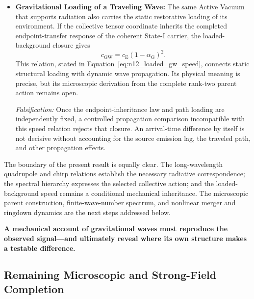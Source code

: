 \begin{itemize}
\textit{Falsification:} A physical test of this spectral hierarchy requires the
corresponding work-conjugate source or detector response to be derived and
independently normalized. If that completed response contradicts the predicted
frequency dependence, the selected collective action is rejected. An apparent
frequency dependence in detector strain alone is not a direct measurement of
these effective material coefficients.

\item \textbf{Gravitational Loading of a Traveling Wave:}
The same Active Vacuum that supports radiation also carries the static
restorative loading of its environment. If the collective tensor coordinate
inherits the completed endpoint-transfer response of the coherent State-I
carrier, the loaded-background closure gives
\begin{equation*}
c_{\mathrm{GW}}=c_{\mathrm E}(1-\alpha_{\mathrm G})^{2}.
\end{equation*}
This relation, stated in Equation~\eqref{eq:n12_loaded_gw_speed}, connects
static structural loading with dynamic wave propagation. Its physical meaning
is precise, but its microscopic derivation from the complete rank-two parent
action remains open.

\textit{Falsification:} Once the endpoint-inheritance law and path loading are
independently fixed, a controlled propagation comparison incompatible with this
speed relation rejects that closure. An arrival-time difference by itself is
not decisive without accounting for the source emission lag, the traveled path,
and other propagation effects.

\end{itemize}

The boundary of the present result is equally clear. The long-wavelength
quadrupole and chirp relations establish the necessary radiative
correspondence; the spectral hierarchy expresses the selected collective
action; and the loaded-background speed remains a conditional mechanical
inheritance. The microscopic parent construction, finite-wave-number spectrum,
and nonlinear merger and ringdown dynamics are the next steps addressed below.

\medskip
\noindent\textbf{A mechanical account of gravitational waves must reproduce the
observed signal---and ultimately reveal where its own structure makes a
testable difference.}

\subsection{Remaining Microscopic and Strong-Field Completion}
\label{subsec:n12_remaining_completion}

